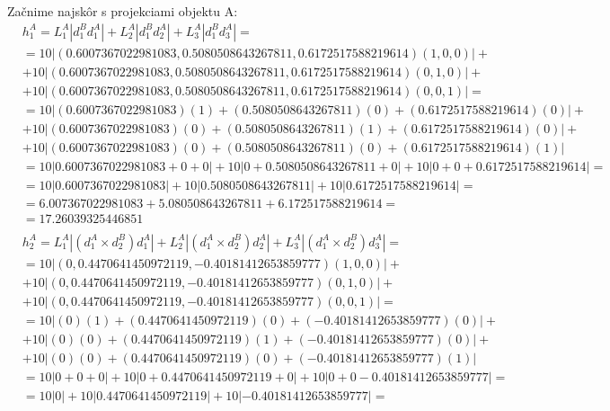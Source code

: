 \documentclass[a4paper]{article}
\begin{document}
	Začnime najskôr s projekciami objektu A:
	\begin{align*}
		&h_1^A = L_1^A|d_1^B d_1^A | + L_2^A|d_1^B d_2^A | + L_3^A|d_1^B d_3^A | = 
		\\
		&= 10| (0.6007367022981083, 0.5080508643267811, 0.6172517588219614) (1,0,0) |+
		\\
		&+ 10| (0.6007367022981083, 0.5080508643267811, 0.6172517588219614) (0,1,0) |+
		\\
		&+ 10| (0.6007367022981083, 0.5080508643267811, 0.6172517588219614) (0,0,1) |=
		\\
		&=10 | (0.6007367022981083)(1) + (0.5080508643267811)(0) + (0.6172517588219614)(0)  |+
		\\
		& +10 | (0.6007367022981083)(0) + (0.5080508643267811)(1) + (0.6172517588219614)(0)  | +
		\\
		& +10 | (0.6007367022981083)(0) + (0.5080508643267811)(0) + (0.6172517588219614)(1)  | 
		\\
		&= 10| 0.6007367022981083 + 0 + 0 | +
		10| 0 + 0.5080508643267811 + 0 |+
		10| 0 + 0 + 0.6172517588219614 |=
		\\
		&= 10| 0.6007367022981083 | +
		10| 0.5080508643267811 |+
		10| 0.6172517588219614 |=
		\\
		&=6.007367022981083 +
		5.080508643267811+
		6.172517588219614 =
		\\
		&= 17.26039325446851
		\\
		\\
		&h_2^A = L_1^A|(d_1^A \times d_2^B) d_1^A | + L_2^A|(d_1^A \times d_2^B) d_2^A | + L_3^A|(d_1^A \times d_2^B) d_3^A | = 
		\\
		&= 10| (0, 0.4470641450972119, -0.40181412653859777) (1,0,0) |+
		\\
		&+ 10| (0, 0.4470641450972119, -0.40181412653859777) (0,1,0) |+
		\\
		&+ 10| (0, 0.4470641450972119, -0.40181412653859777) (0,0,1) |=
		\\
		&=10 | (0)(1) + (0.4470641450972119)(0) + (-0.40181412653859777)(0)  |+
		\\
		& +10 | (0)(0) + (0.4470641450972119)(1) + (-0.40181412653859777)(0)  | +
		\\
		& +10 | (0)(0) + (0.4470641450972119)(0) + (-0.40181412653859777)(1)  | 
		\\
		&= 10| 0 + 0 + 0 | +
		10| 0 + 0.4470641450972119 + 0 |+
		10| 0 + 0 -0.40181412653859777 |=
		\\
		&= 10| 0 | +
		10| 0.4470641450972119 |+
		10| -0.40181412653859777 |=
		\\

\end{align*}
\end{document}
